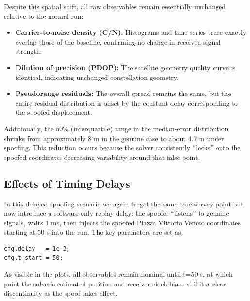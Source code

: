         \noindent Despite this spatial shift, all raw observables remain essentially unchanged relative to the normal run:
        
        \begin{itemize}
            \item \textbf{Carrier-to-noise density (C/N):} Histograms and time-series trace exactly overlap those of the baseline, confirming no change in received signal strength.
            \item \textbf{Dilution of precision (PDOP):} The satellite geometry quality curve is identical, indicating unchanged constellation geometry.
            \item \textbf{Pseudorange residuals:} The overall spread remains the same, but the entire residual distribution is offset by the constant delay corresponding to the spoofed displacement.
        \end{itemize}
        
        \noindent Additionally, the 50\% (interquartile) range in the median-error distribution shrinks from approximately 8 m in the genuine case to about 4.7 m under spoofing. 
        This reduction occurs because the solver consistently “locks” onto the spoofed coordinate, decreasing variability around that false point.

    \subsection{Effects of Timing Delays}

        In this delayed-spoofing scenario we again target the same true survey point but now introduce a software-only replay delay: the spoofer “listens” to genuine signals, waits 1 ms, then injects the spoofed Piazza Vittorio Veneto coordinates starting at 50 s into the run. 
        The key parameters are set as:

        \begin{verbatim}
cfg.delay   = 1e-3;
cfg.t_start = 50;
        \end{verbatim}

        \noindent As visible in the plots, all observables remain nominal until t=50 s, at which point the solver's estimated position and receiver clock-bias exhibit a clear discontinuity as the spoof takes effect.

